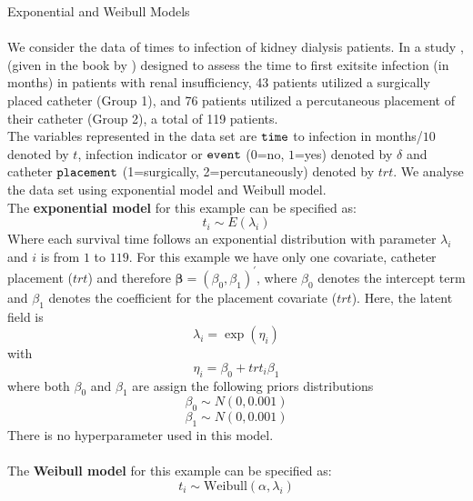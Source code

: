 \documentclass[11pt,a4paper]{article}
\newcommand{\vect}[1]{\boldsymbol{#1}}
\begin{document}

{\Large Exponential  and Weibull Models}\\
\vspace{0.5cm}\\
We consider the  data of times to infection of kidney dialysis patients.
In a study \cite{art504}, (given in the book by \cite{book501})  designed to assess 
the time to first exitsite
infection (in months) in patients with renal insufficiency, 43 patients
utilized a surgically placed catheter (Group 1), and 76 patients utilized
a percutaneous placement of their catheter (Group 2), a total of 119 patients.\\
The variables represented in the data set are $\tt{time}$ to infection in months/$10$
denoted by $t$, infection indicator or $\tt{event}$ ($0$=no, $1$=yes) denoted by  $\delta$ and
 catheter $\tt{placement}$ (1=surgically, 2=percutaneously) denoted by  $trt$. We analyse the data set using exponential model and Weibull model.\\
The \textbf{exponential model} for this example can be specified as:
\begin{displaymath}
t_{i}\sim \mathit{E}(\lambda_{i})
\end{displaymath}
Where each survival time follows an exponential distribution with parameter $\lambda_{i}$  and  $i$ is from $1$ to $119$. 
For this example we have only one covariate, catheter placement ($trt$) 
and therefore $ \vect{\beta} = (\beta_{0},\beta_{1})^{'} $, where $\beta_{0}$ denotes the
intercept term and $\beta_{1}$ denotes the coefficient for the placement covariate ($trt$). Here, the latent field is
\begin{displaymath}
\lambda_{i}= \exp(\eta_{i}) 
\end{displaymath}
with
\begin{displaymath} 
\eta_{i}= \beta_{0}+ trt_{i}\beta_{1} 
\end{displaymath}
where both $\beta_{0}$ and $\beta_{1}$ are assign the following priors distributions
\begin{displaymath}
\beta_{0}\sim N(0,0.001)
\end{displaymath}
\begin{displaymath}
\beta_{1}\sim N(0,0.001)
\end{displaymath} 
There is no hyperparameter used in this model.\\
\\
The \textbf{Weibull model} for this example can be specified as:
\begin{displaymath}
t_{i}\sim \text{Weibull}(\alpha,\lambda_{i})
\end{displaymath}
\end{document}
